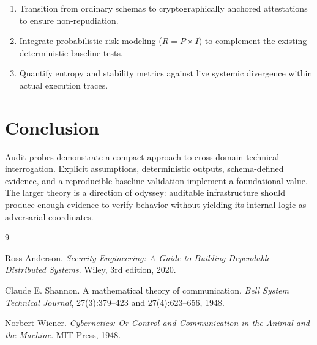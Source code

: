 \documentclass[11pt]{article}
\begin{document}
\begin{enumerate}
\item Transition from ordinary schemas to cryptographically anchored 
attestations to ensure non-repudiation.
\item Integrate probabilistic risk modeling ($R=P \times I$) to complement 
the existing deterministic baseline tests.
\item Quantify entropy and stability metrics against live systemic divergence 
within actual execution traces.
\end{enumerate}

\section{Conclusion}

Audit probes demonstrate a compact approach to cross-domain technical interrogation. Explicit assumptions, deterministic outputs, schema-defined evidence, and a reproducible baseline validation implement a foundational value. The larger theory is a direction of odyssey: auditable infrastructure should produce enough evidence to verify behavior without yielding its internal logic as adversarial coordinates.

\begin{thebibliography}{9}

Ross Anderson.
\newblock \textit{Security Engineering: A Guide to Building Dependable Distributed Systems}.
\newblock Wiley, 3rd edition, 2020. 

Claude E. Shannon.
\newblock A mathematical theory of communication.
\newblock \textit{Bell System Technical Journal}, 27(3):379--423 and 27(4):623--656, 1948.

Norbert Wiener.
\newblock \textit{Cybernetics: Or Control and Communication in the Animal and the Machine}.
\newblock MIT Press, 1948. 

\end{thebibliography}
\end{document}
